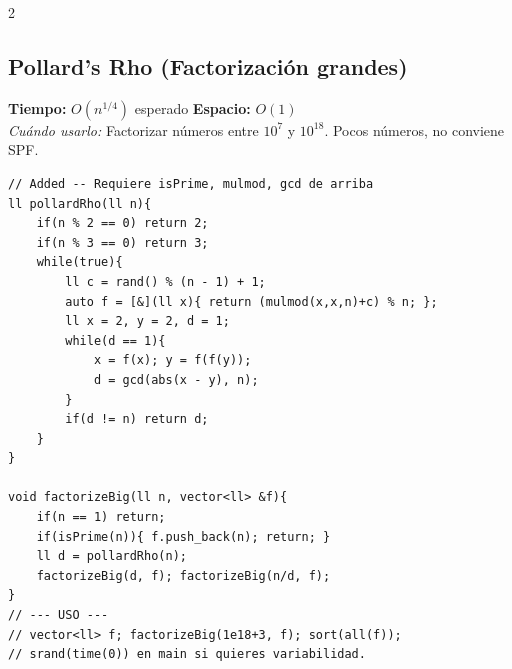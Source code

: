 \documentclass[10pt,a4paper]{article}
\begin{document}
\begin{multicols}{2}
\subsection{Pollard's Rho (Factorizaci\'on grandes)}
\textbf{Tiempo:} $O(n^{1/4})$ esperado \quad \textbf{Espacio:} $O(1)$\\
\textit{Cu\'ando usarlo:} Factorizar n\'umeros entre $10^7$ y $10^{18}$. Pocos n\'umeros, no conviene SPF.

\begin{lstlisting}
// Added -- Requiere isPrime, mulmod, gcd de arriba
ll pollardRho(ll n){
    if(n % 2 == 0) return 2;
    if(n % 3 == 0) return 3;
    while(true){
        ll c = rand() % (n - 1) + 1;
        auto f = [&](ll x){ return (mulmod(x,x,n)+c) % n; };
        ll x = 2, y = 2, d = 1;
        while(d == 1){
            x = f(x); y = f(f(y));
            d = gcd(abs(x - y), n);
        }
        if(d != n) return d;
    }
}

void factorizeBig(ll n, vector<ll> &f){
    if(n == 1) return;
    if(isPrime(n)){ f.push_back(n); return; }
    ll d = pollardRho(n);
    factorizeBig(d, f); factorizeBig(n/d, f);
}
// --- USO ---
// vector<ll> f; factorizeBig(1e18+3, f); sort(all(f));
// srand(time(0)) en main si quieres variabilidad.
\end{lstlisting}


\end{multicols}
\newpage


\end{document}
